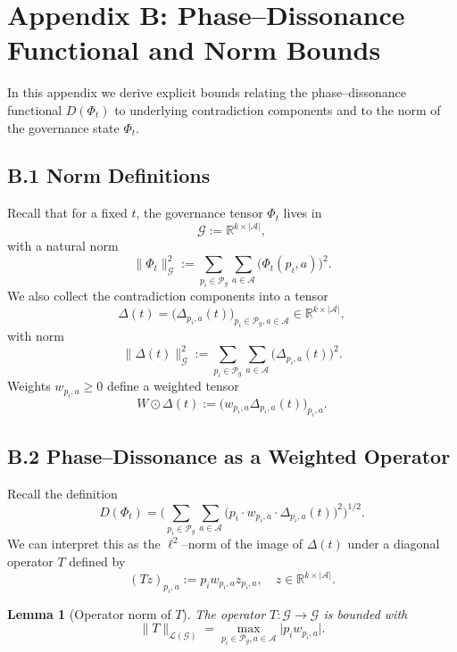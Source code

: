 \documentclass[11pt]{article}
\newtheorem{lemma}[theorem]{Lemma}
\begin{document}
\section{Appendix B: Phase–Dissonance Functional and Norm Bounds}

In this appendix we derive explicit bounds relating the phase--dissonance functional $D(\Phi_t)$ to underlying contradiction components and to the norm of the governance state $\Phi_t$.

\subsection{B.1 Norm Definitions}

Recall that for a fixed $t$, the governance tensor $\Phi_t$ lives in
\[
  \mathcal{G} := \mathbb{R}^{k \times |\mathcal{A}|},
\]
with a natural norm
\begin{equation}\label{eq:Phi-norm}
  \|\Phi_t\|_{\mathcal{G}}^2
  :=
  \sum_{p_i \in \mathcal{P}_g} \sum_{a \in \mathcal{A}}
  \big(\Phi_t(p_i,a)\big)^2.
\end{equation}
We also collect the contradiction components into a tensor
\[
  \Delta(t) = \big(\Delta_{p_i,a}(t)\big)_{p_i \in \mathcal{P}_g, a \in \mathcal{A}} \in \mathbb{R}^{k \times |\mathcal{A}|},
\]
with norm
\begin{equation}\label{eq:Delta-norm}
  \|\Delta(t)\|_{\mathcal{G}}^2
  :=
  \sum_{p_i \in \mathcal{P}_g} \sum_{a \in \mathcal{A}}
  \big(\Delta_{p_i,a}(t)\big)^2.
\end{equation}
Weights $w_{p_i,a} \ge 0$ define a weighted tensor
\[
  W\odot \Delta(t)
  :=
  \big(w_{p_i,a} \Delta_{p_i,a}(t)\big)_{p_i,a}.
\]

\subsection{B.2 Phase–Dissonance as a Weighted Operator}

Recall the definition
\[
  D(\Phi_t)
  =
  \Bigg(
    \sum_{p_i \in \mathcal{P}_g} \sum_{a \in \mathcal{A}}
      \big( p_i \cdot w_{p_i,a} \cdot \Delta_{p_i,a}(t) \big)^2
  \Bigg)^{1/2}.
\]
We can interpret this as the $\ell^2$--norm of the image of $\Delta(t)$ under a diagonal operator $T$ defined by
\[
  (T z)_{p_i,a}
  := p_i w_{p_i,a} z_{p_i,a},
  \quad z \in \mathbb{R}^{k \times |\mathcal{A}|}.
\]

\begin{lemma}[Operator norm of $T$]\label{lem:T-norm}
The operator $T : \mathcal{G} \to \mathcal{G}$ is bounded with
\[
  \|T\|_{\mathcal{L}(\mathcal{G})}
  =
  \max_{p_i \in \mathcal{P}_g, a \in \mathcal{A}} \big| p_i w_{p_i,a} \big|.
\]
\end{lemma}
\end{document}
